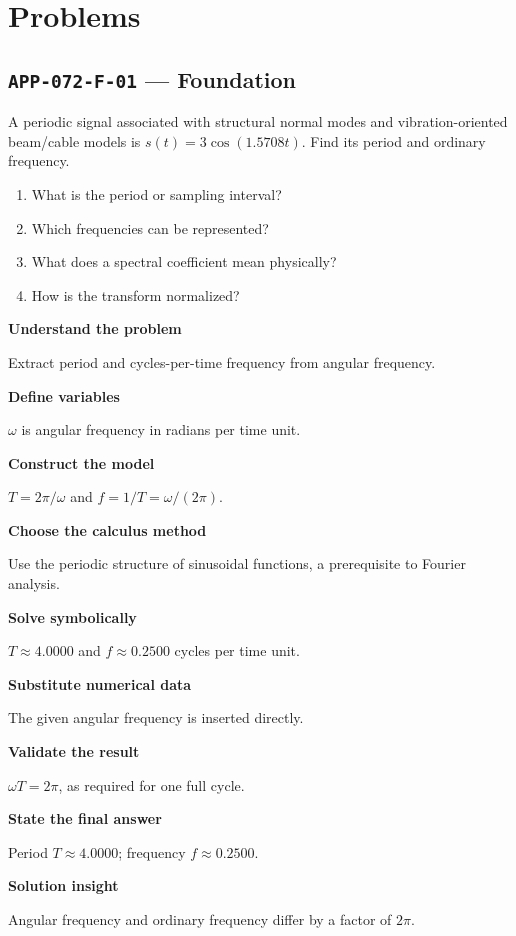 \documentclass[11pt]{book}
\newcommand{\pid}[1]{\texttt{#1}}
\begin{document}
\section*{Problems}
\subsection*{\pid{APP-072-F-01} — Foundation}
\begin{problembox}
A periodic signal associated with structural normal modes and vibration-oriented beam/cable models is $s(t)=3\cos(1.5708t)$. Find its period and ordinary frequency.
\end{problembox}
\begin{promptbox}\begin{enumerate}
\item What is the period or sampling interval?
\item Which frequencies can be represented?
\item What does a spectral coefficient mean physically?
\item How is the transform normalized?
\end{enumerate}\end{promptbox}
\begin{solutionbox}
\textbf{Understand the problem}\par Extract period and cycles-per-time frequency from angular frequency.\par\medskip
\textbf{Define variables}\par $\omega$ is angular frequency in radians per time unit.\par\medskip
\textbf{Construct the model}\par $T=2\pi/\omega$ and $f=1/T=\omega/(2\pi)$.\par\medskip
\textbf{Choose the calculus method}\par Use the periodic structure of sinusoidal functions, a prerequisite to Fourier analysis.\par\medskip
\textbf{Solve symbolically}\par $T\approx 4.0000$ and $f\approx 0.2500$ cycles per time unit.\par\medskip
\textbf{Substitute numerical data}\par The given angular frequency is inserted directly.\par\medskip
\textbf{Validate the result}\par $\omega T=2\pi$, as required for one full cycle.\par\medskip
\textbf{State the final answer}\par Period $T\approx 4.0000$; frequency $f\approx 0.2500$.\par\medskip
\textbf{Solution insight}\par Angular frequency and ordinary frequency differ by a factor of $2\pi$.\par\medskip
\end{solutionbox}
\end{document}
